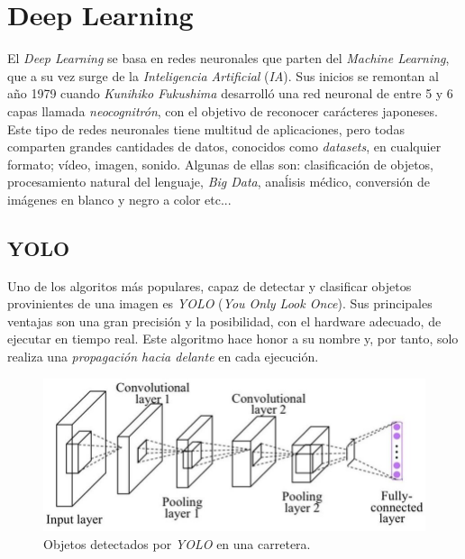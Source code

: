 \section{Deep Learning}
\label{sec:deeplearning}
El \textit{Deep Learning} se basa en redes neuronales que parten del \textit{Machine Learning}, que a su vez surge de la \textit{Inteligencia Artificial} (\textit{IA}). Sus inicios se remontan al año 1979 cuando \textit{Kunihiko Fukushima} desarrolló una red neuronal de entre 5 y 6 capas llamada \textit{neocognitrón}\cite{neocognitron}, con el objetivo de reconocer carácteres japoneses.\\


Este tipo de redes neuronales tiene multitud de aplicaciones, pero todas comparten grandes cantidades de datos, conocidos como \textit{datasets}, en cualquier formato; vídeo, imagen, sonido. Algunas de ellas son: clasificación de objetos, procesamiento natural del lenguaje, \textit{Big Data}, anaĺisis médico, conversión de imágenes en blanco y negro a color etc...\\

\subsection{YOLO}
\label{sec:yolo}

Uno de los algoritos más populares, capaz de detectar y clasificar objetos provinientes de una imagen es \textit{YOLO} (\textit{You Only Look Once}). Sus principales ventajas son una gran precisión y la posibilidad, con el hardware adecuado, de ejecutar en tiempo real. Este algoritmo hace honor a su nombre y, por tanto, solo realiza una \textit{propagación hacia delante} en cada ejecución.\\

\begin{figure} [h!]
	\begin{center}
		\includegraphics[width=12cm]{figs/yolo}
	\end{center}
	\caption{Objetos detectados por \textit{YOLO} en una carretera.}
	\label{fig:yolo}
\end{figure}\

